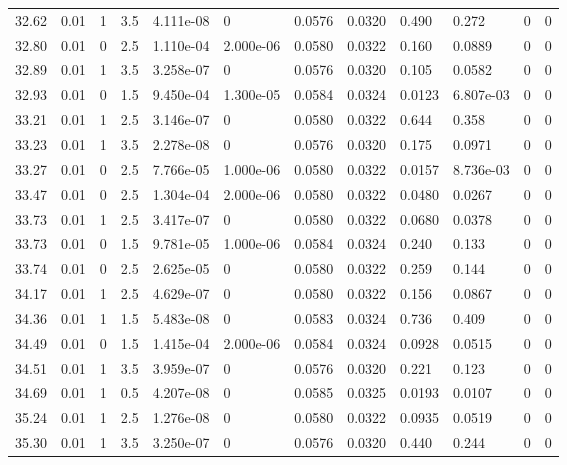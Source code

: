 \documentclass[preview]{standalone}
\begin{document}
{{{{{{\begin{tabular}{L{1.2cm}C{1.2cm} C{0.3cm}C{0.5cm} C{1.4cm}C{1.4cm} C{1.4cm}C{1.4cm} C{1.6cm}C{1.6cm} C{1.6cm}C{1.6cm}}
  32.62  &  0.01  & 1     & 3.5 &  4.111e-08  & 0  &  0.0576&   0.0320& 0.490 & 0.272   &  0 & 0  \\ 
  32.80  &  0.01  & 0     & 2.5 &  1.110e-04  & 2.000e-06  &  0.0580&   0.0322& 0.160 & 0.0889   &  0 & 0  \\ 
  32.89  &  0.01  & 1     & 3.5 &  3.258e-07  & 0  &  0.0576&   0.0320& 0.105 & 0.0582   &  0 & 0  \\ 
  32.93  &  0.01  & 0     & 1.5 &  9.450e-04  & 1.300e-05  &  0.0584&   0.0324& 0.0123 & 6.807e-03   &  0 & 0  \\ 
  33.21  &  0.01  & 1     & 2.5 &  3.146e-07  & 0  &  0.0580&   0.0322& 0.644 & 0.358   &  0 & 0  \\ 
  33.23  &  0.01  & 1     & 3.5 &  2.278e-08  & 0  &  0.0576&   0.0320& 0.175 & 0.0971   &  0 & 0  \\ 
  33.27  &  0.01  & 0     & 2.5 &  7.766e-05  & 1.000e-06  &  0.0580&   0.0322& 0.0157 & 8.736e-03   &  0 & 0  \\ 
  33.47  &  0.01  & 0     & 2.5 &  1.304e-04  & 2.000e-06  &  0.0580&   0.0322& 0.0480 & 0.0267   &  0 & 0  \\ 
  33.73  &  0.01  & 1     & 2.5 &  3.417e-07  & 0  &  0.0580&   0.0322& 0.0680 & 0.0378   &  0 & 0  \\ 
  33.73  &  0.01  & 0     & 1.5 &  9.781e-05  & 1.000e-06  &  0.0584&   0.0324& 0.240 & 0.133   &  0 & 0  \\ 
  33.74  &  0.01  & 0     & 2.5 &  2.625e-05  & 0  &  0.0580&   0.0322& 0.259 & 0.144   &  0 & 0  \\ 
  34.17  &  0.01  & 1     & 2.5 &  4.629e-07  & 0  &  0.0580&   0.0322& 0.156 & 0.0867   &  0 & 0  \\ 
  34.36  &  0.01  & 1     & 1.5 &  5.483e-08  & 0  &  0.0583&   0.0324& 0.736 & 0.409   &  0 & 0  \\ 
  34.49  &  0.01  & 0     & 1.5 &  1.415e-04  & 2.000e-06  &  0.0584&   0.0324& 0.0928 & 0.0515   &  0 & 0  \\ 
  34.51  &  0.01  & 1     & 3.5 &  3.959e-07  & 0  &  0.0576&   0.0320& 0.221 & 0.123   &  0 & 0  \\ 
  34.69  &  0.01  & 1     & 0.5 &  4.207e-08  & 0  &  0.0585&   0.0325& 0.0193 & 0.0107   &  0 & 0  \\ 
  35.24  &  0.01  & 1     & 2.5 &  1.276e-08  & 0  &  0.0580&   0.0322& 0.0935 & 0.0519   &  0 & 0  \\ 
  35.30  &  0.01  & 1     & 3.5 &  3.250e-07  & 0  &  0.0576&   0.0320& 0.440 & 0.244   &  0 & 0  \\ 

\end{tabular}}}}}}}
\end{document}
